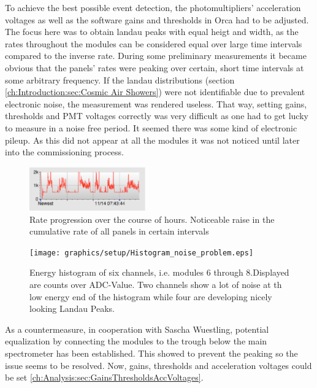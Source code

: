 	To achieve the best possible event detection, the photomultipliers' acceleration voltages as well as the software gains and thresholds in Orca had to be adjusted.
	The focus here was to obtain landau peaks with equal heigt and width, as the rates throughout the modules can be considered equal over large time intervals compared to the inverse rate.
	  During some preliminary measurements it became obvious that the panels' rates were peaking over certain, short time intervals at some arbitrary frequency. If the landau distributions (section \ref{ch:Introduction:sec:Cosmic Air Showers}) were not identifiable due to prevalent electronic noise, the measurement was rendered useless. That way, setting gains, thresholds and PMT voltages correctly was very difficult as one had to get lucky to measure in a noise free period. It seemed there was some kind of electronic pileup. As this did not appear at all the modules it was not noticed until later into the commissioning process.
  \begin{figure}
   \centering
   \includegraphics[width=5cm]{graphics/setup/Noise_Rate_Problem_cutout.eps}
   \caption[Muon modules' rate: noise problems]{Rate progression over the course of hours. Noticeable raise in the cumulative rate of all panels in certain intervals}
  \end{figure}
  
  \begin{figure}
   \centering
   \texttt{[image: graphics/setup/Histogram\_noise\_problem.eps]}
   \caption[Six channel energy histogram with noise]{Energy histogram of six channels, i.e. modules 6 through 8.Displayed are counts over ADC-Value. Two channels show a lot of noise at th low energy end of the histogram while four are developing nicely looking Landau Peaks.}
  \end{figure}
  
  As a countermeasure, in cooperation with Sascha Wuestling, potential equalization by connecting the modules to the trough below the main spectrometer has been established. This showed to prevent the peaking so the issue seems to be resolved. Now, gains, thresholds and acceleration voltages could be set \ref{ch:Analysis:sec:GainsThresholdsAccVoltages}.
  

